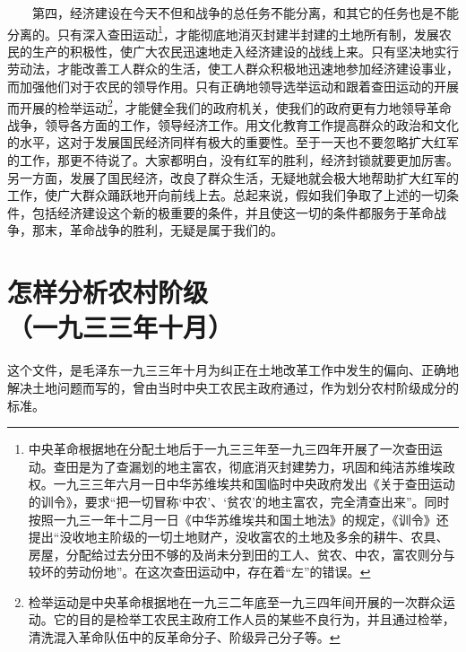 \documentclass[cn,11pt,chinese]{elegantbook}
\def\myformat#1{\hfil\hfil #1}
\begin{document}
　　第四，经济建设在今天不但和战争的总任务不能分离，和其它的任务也是不能分离的。只有深入查田运动\footnote[3]{ 中央革命根据地在分配土地后于一九三三年至一九三四年开展了一次查田运动。查田是为了查漏划的地主富农，彻底消灭封建势力，巩固和纯洁苏维埃政权。一九三三年六月一日中华苏维埃共和国临时中央政府发出《关于查田运动的训令》，要求“把一切冒称‘中农’、‘贫农’的地主富农，完全清查出来”。同时按照一九三一年十二月一日《中华苏维埃共和国土地法》的规定，《训令》还提出“没收地主阶级的一切土地财产，没收富农的土地及多余的耕牛、农具、房屋，分配给过去分田不够的及尚未分到田的工人、贫农、中农，富农则分与较坏的劳动份地”。在这次查田运动中，存在着“左”的错误。}，才能彻底地消灭封建半封建的土地所有制，发展农民的生产的积极性，使广大农民迅速地走入经济建设的战线上来。只有坚决地实行劳动法，才能改善工人群众的生活，使工人群众积极地迅速地参加经济建设事业，而加强他们对于农民的领导作用。只有正确地领导选举运动和跟着查田运动的开展而开展的检举运动\footnote[4]{ 检举运动是中央革命根据地在一九三二年底至一九三四年间开展的一次群众运动。它的目的是检举工农民主政府工作人员的某些不良行为，并且通过检举，清洗混入革命队伍中的反革命分子、阶级异己分子等。}，才能健全我们的政府机关，使我们的政府更有力地领导革命战争，领导各方面的工作，领导经济工作。用文化教育工作提高群众的政治和文化的水平，这对于发展国民经济同样有极大的重要性。至于一天也不要忽略扩大红军的工作，那更不待说了。大家都明白，没有红军的胜利，经济封锁就要更加厉害。另一方面，发展了国民经济，改良了群众生活，无疑地就会极大地帮助扩大红军的工作，使广大群众踊跃地开向前线上去。总起来说，假如我们争取了上述的一切条件，包括经济建设这个新的极重要的条件，并且使这一切的条件都服务于革命战争，那末，革命战争的胜利，无疑是属于我们的。\\
\newpage\section*{\myformat{怎样分析农村阶级}\\\myformat{（一九三三年十月）}}
\begin{introduction}\item  这个文件，是毛泽东一九三三年十月为纠正在土地改革工作中发生的偏向、正确地解决土地问题而写的，曾由当时中央工农民主政府通过，作为划分农村阶级成分的标准。\end{introduction}
\end{document}
